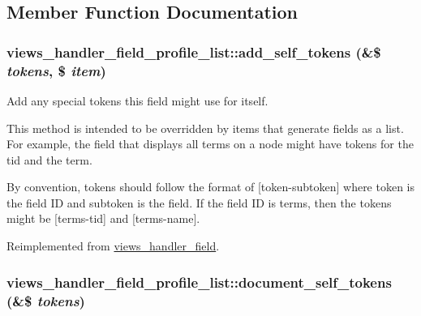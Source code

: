 \subsection{Member Function Documentation}
\hypertarget{classviews__handler__field__profile__list_411c5238debac02e7cb3f582f7cd8e9f}{
\subsubsection[{add\_\-self\_\-tokens}]{\setlength{\rightskip}{0pt plus 5cm}views\_\-handler\_\-field\_\-profile\_\-list::add\_\-self\_\-tokens (\&\$ {\em tokens}, \/  \$ {\em item})}}
\label{classviews__handler__field__profile__list_411c5238debac02e7cb3f582f7cd8e9f}


Add any special tokens this field might use for itself.

This method is intended to be overridden by items that generate fields as a list. For example, the field that displays all terms on a node might have tokens for the tid and the term.

By convention, tokens should follow the format of \mbox{[}token-subtoken\mbox{]} where token is the field ID and subtoken is the field. If the field ID is terms, then the tokens might be \mbox{[}terms-tid\mbox{]} and \mbox{[}terms-name\mbox{]}. 

Reimplemented from \hyperlink{classviews__handler__field_c61cc83a4c8c579993a254b5b1e16cbc}{views\_\-handler\_\-field}.\hypertarget{classviews__handler__field__profile__list_b3950ce980ce3c8e8ce274a25b4e3351}{
\subsubsection[{document\_\-self\_\-tokens}]{\setlength{\rightskip}{0pt plus 5cm}views\_\-handler\_\-field\_\-profile\_\-list::document\_\-self\_\-tokens (\&\$ {\em tokens})}}
\label{classviews__handler__field__profile__list_b3950ce980ce3c8e8ce274a25b4e3351}


